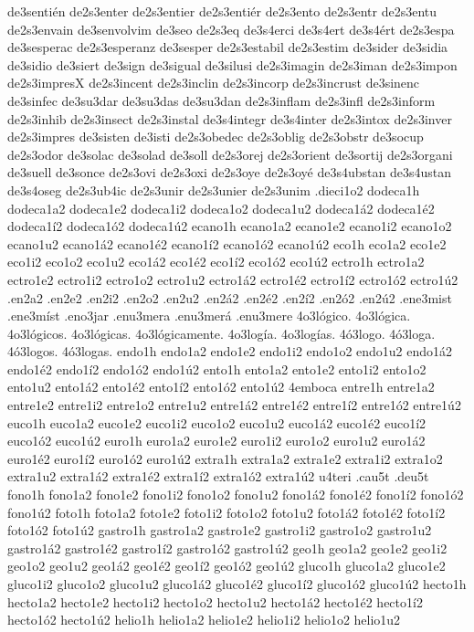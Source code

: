 {de3sentién
de2s3enter
de2s3entier
de2s3entiér
de2s3ento
de2s3entr
de2s3entu
de2s3envain
de3senvolvim
de3seo
de2s3eq
de3s4erci
de3s4ert
de3s4ért
de2s3espa
de3sesperac
de2s3esperanz
de3sesper
de2s3estabil
de2s3estim
de3sider
de3sidia
de3sidio
de3siert
de3sign
de3sigual
de3silusi
de2s3imagin
de2s3iman
de2s3impon
de2s3impresX
de2s3incent
de2s3inclin
de2s3incorp
de2s3incrust
de3sinenc
de3sinfec
de3su3dar
de3su3das
de3su3dan
de2s3inflam
de2s3infl
de2s3inform
de2s3inhib
de2s3insect
de2s3instal
de3s4integr
de3s4inter
de2s3intox
de2s3inver
de2s3impres
de3sisten
de3isti
de2s3obedec
de2s3oblig
de2s3obstr
de3socup
de2s3odor
de3solac
de3solad
de3soll
de2s3orej
de2s3orient
de3sortij
de2s3organi
de3suell
de3sonce
de2s3ovi
de2s3oxi
de2s3oye
de2s3oyé
de3s4ubstan
de3s4ustan
de3s4oseg
de2s3ub4ic
de2s3unir
de2s3unier
de2s3unim
.dieci1o2
dodeca1h
dodeca1a2 dodeca1e2 dodeca1i2 dodeca1o2 dodeca1u2
dodeca1á2 dodeca1é2 dodeca1í2 dodeca1ó2 dodeca1ú2
ecano1h
ecano1a2 ecano1e2 ecano1i2 ecano1o2 ecano1u2
ecano1á2 ecano1é2 ecano1í2 ecano1ó2 ecano1ú2
eco1h
eco1a2 eco1e2 eco1i2 eco1o2 eco1u2
eco1á2 eco1é2 eco1í2 eco1ó2 eco1ú2
ectro1h
ectro1a2 ectro1e2 ectro1i2 ectro1o2 ectro1u2
ectro1á2 ectro1é2 ectro1í2 ectro1ó2 ectro1ú2
.en2a2 .en2e2 .en2i2 .en2o2 .en2u2
.en2á2 .en2é2 .en2í2 .en2ó2 .en2ú2
.ene3mist
.ene3míst
.eno3jar
.enu3mera
.enu3merá
.enu3mere
4o3lógico.
4o3lógica.
4o3lógicos.
4o3lógicas.
4o3lógicamente.
4o3logía.
4o3logías.
4ó3logo.
4ó3loga.
4ó3logos.
4ó3logas.
endo1h
endo1a2 endo1e2 endo1i2 endo1o2 endo1u2
endo1á2 endo1é2 endo1í2 endo1ó2 endo1ú2
ento1h
ento1a2 ento1e2 ento1i2 ento1o2 ento1u2
ento1á2 ento1é2 ento1í2 ento1ó2 ento1ú2
4emboca
entre1h
entre1a2 entre1e2 entre1i2 entre1o2 entre1u2
entre1á2 entre1é2 entre1í2 entre1ó2 entre1ú2
euco1h
euco1a2 euco1e2 euco1i2 euco1o2 euco1u2
euco1á2 euco1é2 euco1í2 euco1ó2 euco1ú2
euro1h
euro1a2 euro1e2 euro1i2 euro1o2 euro1u2
euro1á2 euro1é2 euro1í2 euro1ó2 euro1ú2
extra1h
extra1a2 extra1e2 extra1i2 extra1o2 extra1u2
extra1á2 extra1é2 extra1í2 extra1ó2 extra1ú2
u4teri
.cau5t
.deu5t
fono1h
fono1a2 fono1e2 fono1i2 fono1o2 fono1u2
fono1á2 fono1é2 fono1í2 fono1ó2 fono1ú2
foto1h
foto1a2 foto1e2 foto1i2 foto1o2 foto1u2
foto1á2 foto1é2 foto1í2 foto1ó2 foto1ú2
gastro1h
gastro1a2 gastro1e2 gastro1i2 gastro1o2 gastro1u2
gastro1á2 gastro1é2 gastro1í2 gastro1ó2 gastro1ú2
geo1h
geo1a2 geo1e2 geo1i2 geo1o2 geo1u2
geo1á2 geo1é2 geo1í2 geo1ó2 geo1ú2
gluco1h
gluco1a2 gluco1e2 gluco1i2 gluco1o2 gluco1u2
gluco1á2 gluco1é2 gluco1í2 gluco1ó2 gluco1ú2
hecto1h
hecto1a2 hecto1e2 hecto1i2 hecto1o2 hecto1u2
hecto1á2 hecto1é2 hecto1í2 hecto1ó2 hecto1ú2
helio1h
helio1a2 helio1e2 helio1i2 helio1o2 helio1u2
}
